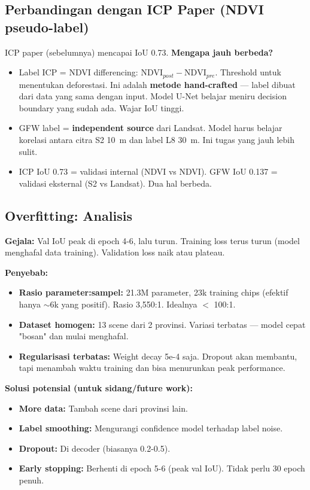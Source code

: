 \documentclass[10pt,a4paper,onecolumn]{article}
\begin{document}
\subsection{Perbandingan dengan ICP Paper (NDVI pseudo-label)}

ICP paper (sebelumnya) mencapai IoU 0.73. \textbf{Mengapa jauh
berbeda?}
\begin{itemize}[nosep]
    \item Label ICP = NDVI differencing: $\text{NDVI}_{post} -
          \text{NDVI}_{pre}$. Threshold untuk menentukan deforestasi.
          Ini adalah \textbf{metode hand-crafted} — label dibuat dari
          data yang sama dengan input. Model U-Net belajar meniru
          decision boundary yang sudah ada. Wajar IoU tinggi.
    \item GFW label = \textbf{independent source} dari Landsat.
          Model harus belajar korelasi antara citra S2 10~m dan label
          L8 30~m. Ini tugas yang jauh lebih sulit.
    \item ICP IoU 0.73 = validasi internal (NDVI vs NDVI). GFW IoU
          0.137 = validasi eksternal (S2 vs Landsat). Dua hal berbeda.
\end{itemize}

\subsection{Overfitting: Analisis}

\textbf{Gejala:} Val IoU peak di epoch 4-6, lalu turun. Training
loss terus turun (model menghafal data training). Validation loss
naik atau plateau.

\textbf{Penyebab:}
\begin{itemize}[nosep]
    \item \textbf{Rasio parameter:sampel:} 21.3M parameter, 23k
          training chips (efektif hanya $\sim$6k yang positif).
          Rasio 3,550:1. Idealnya $<$ 100:1.
    \item \textbf{Dataset homogen:} 13 scene dari 2 provinsi.
          Variasi terbatas — model cepat "bosan" dan mulai menghafal.
    \item \textbf{Regularisasi terbatas:} Weight decay 5e-4 saja.
          Dropout akan membantu, tapi menambah waktu training dan
          bisa menurunkan peak performance.
\end{itemize}

\textbf{Solusi potensial (untuk sidang/future work):}
\begin{itemize}[nosep]
    \item \textbf{More data:} Tambah scene dari provinsi lain.
    \item \textbf{Label smoothing:} Mengurangi confidence model
          terhadap label noise.
    \item \textbf{Dropout:} Di decoder (biasanya 0.2-0.5).
    \item \textbf{Early stopping:} Berhenti di epoch 5-6 (peak val
          IoU). Tidak perlu 30 epoch penuh.
\end{itemize}
\end{document}
